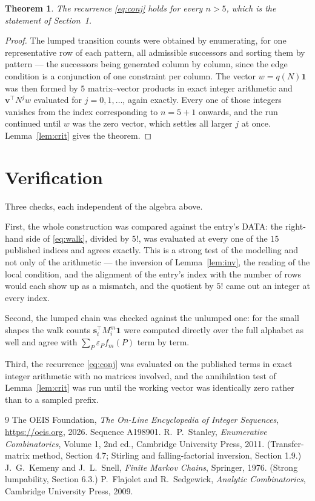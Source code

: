 \documentclass[11pt,a4paper]{article}
\theoremstyle{plain}
\newtheorem{theorem}{Theorem}
\theoremstyle{definition}
\begin{document}
\begin{theorem}
The recurrence \eqref{eq:conj} holds for every $n>5$, which is the statement of
Section~1.
\end{theorem}

\begin{proof}
The lumped transition counts were obtained by enumerating, for one representative row of
each pattern, all admissible successors and sorting them by pattern --- the successors being
generated column by column, since the edge condition is a conjunction of one constraint per
column. The vector $w=q(N)\mathbf{1}$ was then formed by $5$ matrix--vector products
in exact integer arithmetic and $\mathbf{v}^{\!\top}N^{j}w$ evaluated for
$j=0,1,\dots$, again exactly. Every one of those integers vanishes from the index
corresponding to $n=5+1$ onwards, and the run continued until $w$ was the zero vector,
which settles all larger $j$ at once. Lemma~\ref{lem:crit} gives the theorem.
\end{proof}

\section{Verification}

Three checks, each independent of the algebra above.

First, the whole construction was compared against the entry's DATA: the right-hand side of
\eqref{eq:walk}, divided by $5!$, was evaluated at every one of the $15$
published indices and agrees exactly. This is a strong test of the modelling and not only of
the arithmetic --- the inversion of Lemma~\ref{lem:inv}, the reading of the local
condition, and the alignment of the entry's index with the number of rows would each
show up as a mismatch, and the quotient by $5!$ came out an integer at every index.

Second, the lumped chain was checked against the unlumped one: for the small shapes the walk
counts $\mathbf{s}_i^{\!\top}M_i^{m}\mathbf{1}$ were computed directly over the full
alphabet as well and agree with $\sum_P\varepsilon_Pf_m(P)$ term by term.

Third, the recurrence \eqref{eq:conj} was evaluated on the published terms in exact integer
arithmetic with no matrices involved, and the annihilation test of Lemma~\ref{lem:crit} was
run until the working vector was identically zero rather than to a sampled prefix.

\begin{thebibliography}{9}
 The OEIS Foundation, \emph{The On-Line Encyclopedia of Integer
Sequences}, \url{https://oeis.org}, 2026. Sequence A198901.
 R.~P.~Stanley, \emph{Enumerative Combinatorics}, Volume 1, 2nd ed.,
Cambridge University Press, 2011. (Transfer-matrix method, Section 4.7; Stirling and
falling-factorial inversion, Section 1.9.)
 J.~G.~Kemeny and J.~L.~Snell, \emph{Finite Markov Chains}, Springer,
1976. (Strong lumpability, Section 6.3.)
 P.~Flajolet and R.~Sedgewick, \emph{Analytic Combinatorics}, Cambridge
University Press, 2009.
\end{thebibliography}
\end{document}
